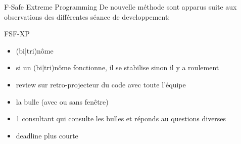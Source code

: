 {
%
\begin{frame}{F-Safe Extreme Programming}
  De nouvelle méthode sont apparus suite aux observations des différentes séance de developpement:
  \begin{exampleblock}{FSF-XP}
    \begin{itemize}
    \item (bi|tri)nôme
    \item si un (bi|tri)nôme fonctionne, il se stabilise sinon il y a roulement
    \item review sur retro-projecteur du code avec toute l'équipe
    \item la bulle (avec ou sans fenêtre)
    \item 1 consultant qui consulte les bulles et réponds au questions diverses
    \item deadline plus courte
    \end{itemize}
  \end{exampleblock}
\end{frame}
}

